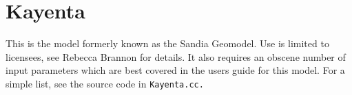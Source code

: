 \section{Kayenta} This is the model formerly known as the Sandia Geomodel.  Use
is limited to licensees, see Rebecca Brannon for details.  It also requires
an obscene number of input parameters which are best covered in the users
guide for this model.  For a simple list, see the source code in
\tt Kayenta.cc. \normalfont
